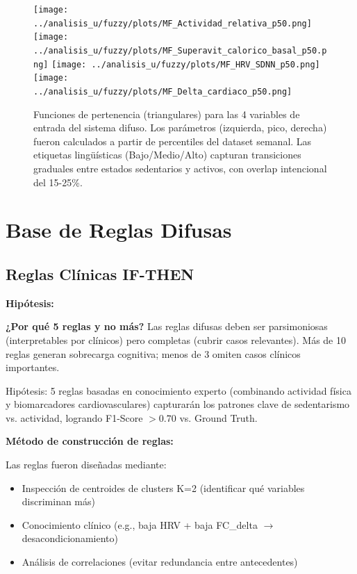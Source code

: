 \documentclass[12pt,letterpaper,twoside]{report}
\begin{document}
\begin{calculobox}
\begin{figure}[htbp]
\centering
\texttt{[image: ../analisis\_u/fuzzy/plots/MF\_Actividad\_relativa\_p50.png]}
\texttt{[image: ../analisis\_u/fuzzy/plots/MF\_Superavit\_calorico\_basal\_p50.png]}
\texttt{[image: ../analisis\_u/fuzzy/plots/MF\_HRV\_SDNN\_p50.png]}
\texttt{[image: ../analisis\_u/fuzzy/plots/MF\_Delta\_cardiaco\_p50.png]}
\caption{Funciones de pertenencia (triangulares) para las 4 variables de entrada del sistema difuso. Los parámetros (izquierda, pico, derecha) fueron calculados a partir de percentiles del dataset semanal. Las etiquetas lingüísticas (Bajo/Medio/Alto) capturan transiciones graduales entre estados sedentarios y activos, con overlap intencional del 15-25\%.}
\label{fig:membership_functions}
\end{figure}

\section{Base de Reglas Difusas}

\subsection{Reglas Clínicas IF-THEN}

\begin{hipotesisbox}
\textbf{Hipótesis:}

\textbf{¿Por qué 5 reglas y no más?} Las reglas difusas deben ser parsimoniosas (interpretables por clínicos) pero completas (cubrir casos relevantes). Más de 10 reglas generan sobrecarga cognitiva; menos de 3 omiten casos clínicos importantes.

Hipótesis: 5 reglas basadas en conocimiento experto (combinando actividad física y biomarcadores cardiovasculares) capturarán los patrones clave de sedentarismo vs. actividad, logrando F1-Score $> 0.70$ vs. Ground Truth.
\end{hipotesisbox}

\begin{estadisticobox}
\textbf{Método de construcción de reglas:}

Las reglas fueron diseñadas mediante:
\begin{itemize}[noitemsep]
    \item Inspección de centroides de clusters K=2 (identificar qué variables discriminan más)
    \item Conocimiento clínico (e.g., baja HRV + baja FC\_delta $\to$ desacondicionamiento)
    \item Análisis de correlaciones (evitar redundancia entre antecedentes)
\end{itemize}


\end{estadisticobox}
\end{calculobox}
\end{document}
